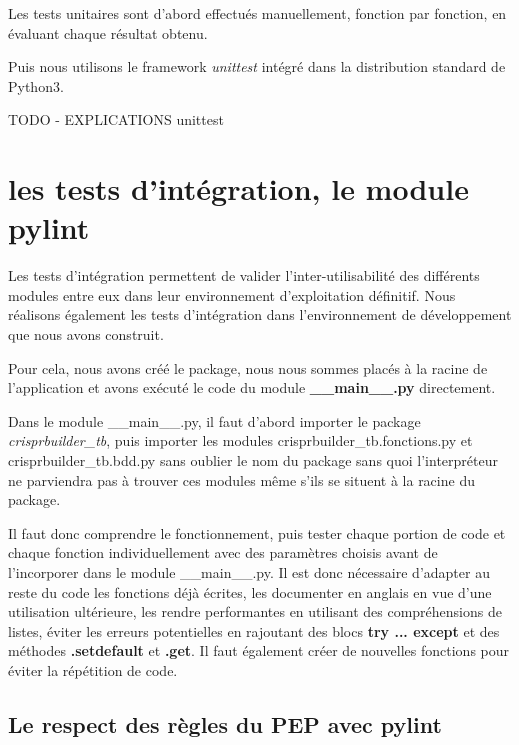 \documentclass[twoside,a4paper,11pt,frenchb,openany]{report}
\begin{document}
Les tests unitaires sont d'abord effectués manuellement, fonction par fonction, en évaluant chaque résultat obtenu.

Puis nous utilisons le framework \textit{unittest} intégré dans la distribution standard de Python3.

TODO - EXPLICATIONS unittest





\section{les tests d'intégration, le module pylint}

Les tests d'intégration permettent de valider l'inter-utilisabilité des différents modules entre eux dans leur environnement d'exploitation définitif. Nous réalisons également les tests d'intégration dans l'environnement de développement que nous avons construit.

Pour cela, nous avons créé le package, nous nous sommes placés à la racine de l'application et avons exécuté le code du module \textbf{\_\_main\_\_.py} directement.

Dans le module \_\_main\_\_.py, il faut d'abord importer le package \textit{crisprbuilder\_tb}, puis importer les modules crisprbuilder\_tb.fonctions.py et crisprbuilder\_tb.bdd.py sans oublier le nom du package sans quoi l'interpréteur ne parviendra pas à trouver ces modules même s'ils se situent à la racine du package.  

Il faut donc comprendre le fonctionnement, puis tester chaque portion de code et chaque fonction individuellement avec des paramètres choisis avant de l'incorporer dans le module \_\_main\_\_.py. Il est donc nécessaire d'adapter au reste du code les fonctions déjà écrites, les documenter en anglais en vue d'une utilisation ultérieure, les rendre performantes en utilisant des compréhensions de listes, éviter les erreurs potentielles en rajoutant des blocs \textbf{try ... except} et des méthodes \textbf{.setdefault} et \textbf{.get}. Il faut également créer de nouvelles fonctions pour éviter la répétition de code.

\subsection{Le respect des règles du PEP avec pylint}
\end{document}
